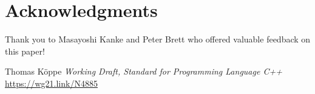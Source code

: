 \documentclass{wg21}
\begin{document}
%
%
%
%
%
%


\section{Acknowledgments}

Thank you to Masayoshi Kanke and Peter Brett who offered valuable feedback on this paper!






\renewcommand{\section}[2]{}%
\begin{thebibliography}{9}

Thomas Köppe
\emph{Working Draft, Standard for Programming Language C++}\newline
\url{https://wg21.link/N4885}

\end{thebibliography}
\end{document}
